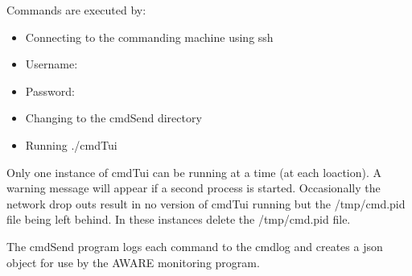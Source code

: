 \documentclass{article}
\begin{document}
Commands are executed by:
\begin{itemize}
\item Connecting to the commanding machine using ssh
\item Username:  
\item Password:
\item Changing to the cmdSend directory
\item Running ./cmdTui
\end{itemize}

Only one instance of cmdTui can be running at a time (at each loaction). A warning message will appear if a second process is started. Occasionally the network drop outs result in no version of cmdTui running but the /tmp/cmd.pid file being left behind. In these instances delete the /tmp/cmd.pid file.

The cmdSend program logs each command to the cmdlog and creates a json object for use by the AWARE monitoring program.
\end{document}

